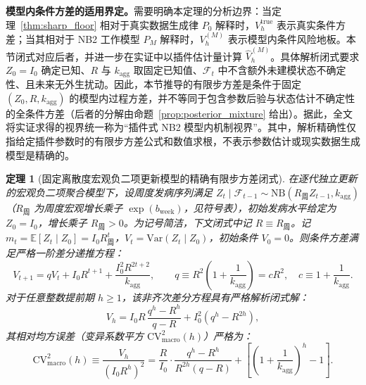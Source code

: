 \documentclass[11pt,a4paper]{article}
\theoremstyle{plain}
\newtheorem{theorem}{定理}
\theoremstyle{definition}
\begin{document}

\label{sec:macro_model}

\noindent\textbf{模型内条件方差的适用界定。}需要明确本定理的分析边界：当定理~\ref{thm:sharp_floor} 相对于真实数据生成律 $P_0$ 解释时，$V_h^{\mathrm{true}}$ 表示真实条件方差；当其相对于 NB2 工作模型 $P_M$ 解释时，$V_h^{(M)}$ 表示模型内条件风险地板。本节闭式对应后者，并进一步在实证中以插件估计量计算 $\widehat{V}_h^{(M)}$。具体解析闭式要求 $Z_0=I_0$ 确定已知、$R$ 与 $k_{\text{agg}}$ 取固定已知值、$\mathcal{F}_t$ 中不含额外未建模状态不确定性、且未来无外生扰动。因此，本节推导的有限步方差是条件于固定 $(Z_0,R,k_{\text{agg}})$ 的模型内过程方差，并不等同于包含参数后验与状态估计不确定性的全条件方差（后者的分解由命题~\ref{prop:posterior_mixture} 给出）。据此，全文将实证求得的视界统一称为“插件式 NB2 模型内机制视界”。其中，解析精确性仅指给定插件参数时的有限步方差公式和数值求根，不表示参数估计或现实数据生成模型是精确的。

\begin{theorem}[固定离散度宏观负二项更新模型的精确有限步方差闭式]\label{thm:macro_exact}
在逐代独立更新的宏观负二项聚合模型下，设周度发病序列满足 $Z_t \mid \mathcal{F}_{t-1} \sim \text{NB}(R_{\text{周}} Z_{t-1}, k_{\text{agg}})$（$R_{\text{周}}$ 为周度宏观增长乘子 $\exp(b_{\text{week}})$，见符号表），初始发病水平给定为 $Z_0 = I_0$，增长乘子 $R_{\text{周}} > 0$。为记号简洁，下文闭式中记 $R \equiv R_{\text{周}}$。记 $m_t = \mathbb{E}[Z_t \mid Z_0] = I_0 R_{\text{周}}^t$，$V_t = \text{Var}(Z_t \mid Z_0)$，初始条件 $V_0 = 0$。则条件方差满足严格一阶差分递推方程：
\begin{equation}
V_{t+1} = q V_t + I_0 R^{t+1} + \frac{I_0^2 R^{2t+2}}{k_{\text{agg}}}, \qquad q \equiv R^2 \left(1 + \frac{1}{k_{\text{agg}}}\right) = c R^2, \quad c \equiv 1 + \frac{1}{k_{\text{agg}}}. \label{eq:macro_var_recurrence}
\end{equation}
对于任意整数提前期 $h \ge 1$，该非齐次差分方程具有严格解析闭式解：
\begin{equation}
V_h = I_0 R\, \frac{q^h - R^h}{q - R} + I_0^2 \left(q^h - R^{2h}\right), \label{eq:macro_var_closed}
\end{equation}
其相对均方误差（变异系数平方 $\text{CV}^2_{\text{macro}}(h)$）严格为：
\begin{equation}
\text{CV}^2_{\text{macro}}(h) \equiv \frac{V_h}{(I_0 R^h)^2} = \frac{R}{I_0}\cdot\frac{q^h - R^h}{R^{2h}(q - R)} + \left[\left(1 + \frac{1}{k_{\text{agg}}}\right)^{\!h} - 1\right]. \label{eq:macro_cv2_closed}
\end{equation}
\end{theorem}
\end{document}
